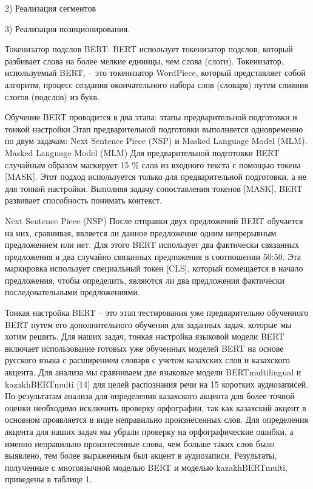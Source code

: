 \begin{multicols}{2}
2) Реализация сегментов

3) Реализация позиционирования.

Токенизатор подслов BERT: BERT использует токенизатор подслов, который
разбивает слова на более мелкие единицы, чем слова (слоги). Токенизатор,
используемый BERT, -- это токенизатор WordPiece, который представляет
собой алгоритм, процесс создания окончательного набора слов (словаря)
путем слияния слогов (подслов) из букв.

Обучение BERT проводится в два этапа: этапы предварительной подготовки и
тонкой настройки Этап предварительной подготовки выполняется
одновременно по двум задачам: Next Sentence Piece (NSP) и Masked
Language Model (MLM). Masked Language Model (MLM) Для предварительной
подготовки BERT случайным образом маскирует 15 \% слов из входного
текста с помощью токена {[}MASK{]}. Этот подход используется только для
предварительной подготовки, а не для тонкой настройки. Выполняя задачу
сопоставления токенов {[}MASK{]}, BERT развивает способность понимать
контекст.

Next Sentence Piece (NSP) После отправки двух предложений BERT обучается
на них, сравнивая, является ли данное предложение одним непрерывным
предложением или нет. Для этого BERT использует два фактически связанных
предложения и два случайно связанных предложения в соотношении 50:50.
Эта маркировка использует специальный токен {[}CLS{]}, который
помещается в начало предложения, чтобы определить, являются ли два
предложения фактически последовательными предложениями.

Тонкая настройка BERT -- это этап тестирования уже предварительно
обученного BERT путем его дополнительного обучения для заданных задач,
которые мы хотим решить. Для наших задач, тонкая настройка языковой
модели BERT включает использование готовых уже обученных моделей BERT на
основе русского языка с расширением словаря с учетом казахских слов и
казахского акцента. Для анализа мы сравниваем две языковые модели
BERTmultilingual и kazakhBERTmulti {[}14{]} для целей распознания речи
на 15 коротких аудиозаписей. По результатам анализа для определения
казахского акцента для более точной оценки необходимо исключить проверку
орфографии, так как казахский акцент в основном проявляется в виде
неправильно произнесенных слов. Для определения акцента для наших задач
мы убрали проверку на орфографические ошибки, а именно неправильно
произнесенные слова, чем больше таких слов было выявлено, тем более
выраженным был акцент в аудиозаписи. Результаты, полученные с
многоязычной моделью BERT и моделью kazakhBERTmulti, приведены в таблице
1.
\end{multicols}

